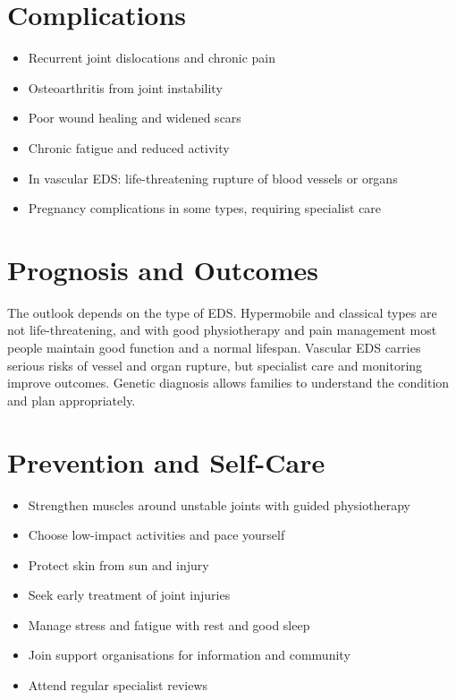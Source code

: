 \section*{Complications}
\begin{itemize}
    \item Recurrent joint dislocations and chronic pain
    \item Osteoarthritis from joint instability
    \item Poor wound healing and widened scars
    \item Chronic fatigue and reduced activity
    \item In vascular EDS: life-threatening rupture of blood vessels or organs
    \item Pregnancy complications in some types, requiring specialist care
\end{itemize}

\section*{Prognosis and Outcomes}
The outlook depends on the type of EDS. Hypermobile and classical types are not life-threatening, and with good physiotherapy and pain management most people maintain good function and a normal lifespan. Vascular EDS carries serious risks of vessel and organ rupture, but specialist care and monitoring improve outcomes. Genetic diagnosis allows families to understand the condition and plan appropriately.

\section*{Prevention and Self-Care}
\begin{itemize}
    \item Strengthen muscles around unstable joints with guided physiotherapy
    \item Choose low-impact activities and pace yourself
    \item Protect skin from sun and injury
    \item Seek early treatment of joint injuries
    \item Manage stress and fatigue with rest and good sleep
    \item Join support organisations for information and community
    \item Attend regular specialist reviews
\end{itemize}


